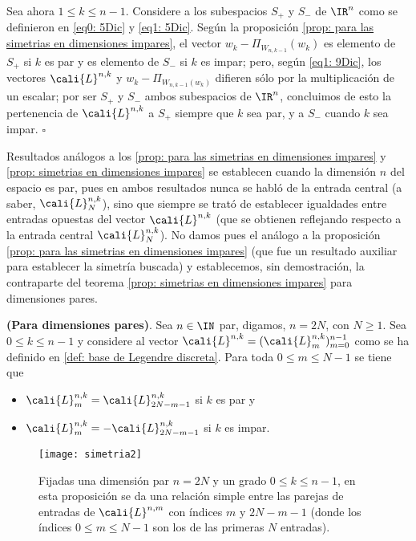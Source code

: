 Sea ahora $1 \leq k \leq n-1$.
Considere a los subespacios $S_{+}$
y $S_{-}$ de $\IR^{n}$ como se definieron en 
\eqref{eq0: 5Dic} y \eqref{eq1: 5Dic}.
Según la proposición 
\ref{prop: para las simetrias en dimensiones impares}, 
el vector $w_{k}- \Pi_{W_{n,k-1}}(w_{k})$
es elemento de $S_{+}$ si $k$ es par y es elemento 
de $S_{-}$ si $k$ es impar; pero,
según \eqref{eq1: 9Dic},
los vectores $\cali{L}^{n,k}$ y 
$w_{k}- \Pi_{W_{n,k-1}(w_{k})}$
difieren sólo por la multiplicación
de un escalar; por ser
$S_{+}$ y $S_{-}$ ambos subespacios de $\IR^{n}$, 
concluimos de esto la pertenencia 
de $\cali{L}^{n,k}$ a $S_{+}$ siempre que $k$ sea par,
y a $S_{-}$ cuando $k$ sea impar.
\null\nobreak\hfill\ensuremath{\square} %
\vspace{0.2cm}


Resultados análogos a los
\ref{prop: para las simetrias en dimensiones impares}
y 
\ref{prop: simetrias en dimensiones impares} se establecen
cuando la dimensión $n$ 
del espacio es par, pues en ambos resultados 
nunca se habló de la entrada central (a saber, $\cali{L}^{n, k}_{N}$),
sino que siempre se trató de establecer igualdades entre
entradas opuestas del vector $\cali{L}^{n,k}$
(que se obtienen reflejando respecto a la entrada central 
$\cali{L}^{n, k}_{N}$).
No damos pues el análogo a la proposición 
\ref{prop: para las simetrias en dimensiones impares} 
(que fue un resultado auxiliar para establecer la simetría buscada)
y establecemos, sin demostración, la contraparte del
teorema
\ref{prop: simetrias en dimensiones impares} 
para dimensiones pares.


\begin{teo}
\label{prop: simetrias en dimensiones pares}
\textbf{(Para dimensiones pares)}. Sea $n \in \IN$ par, digamos,
$n=2N$, con $N \geq 1$. Sea $0 \leq k \leq n-1$ y
considere al vector $\cali{L}^{n,k}=(\cali{L}^{n,k}_{m})_{m=0}^{n-1}$
como se ha definido en \eqref{def: base de Legendre discreta}.
Para toda $0 \leq m \leq N-1$ se tiene que
\begin{itemize}
\item $\cali{L}^{n,k}_{m} = \cali{L}^{n,k}_{2N-m-1}$ si $k$ es par y
\item $\cali{L}^{n,k}_{m} = -\cali{L}^{n,k}_{2N-m-1}$ si $k$ es impar.
\end{itemize}

\begin{figure}[H]
\centering\captionsetup{format = hang}
	\begin{measuredfigure}
		\texttt{[image: simetria2]} 
		\caption{Fijadas una dimensión par $n=2N$ 
		y un grado $0 \leq k \leq n-1$,
		en esta proposición se da una relación simple entre las parejas 
		de entradas de $\cali{L}^{n,m}$ con índices $m$ y $2N-m-1$ 
		(donde los índices $0 \leq m \leq N-1$ son los de las primeras
		$N$ entradas).}
 	\end{measuredfigure}
 \end{figure}
\end{teo}

